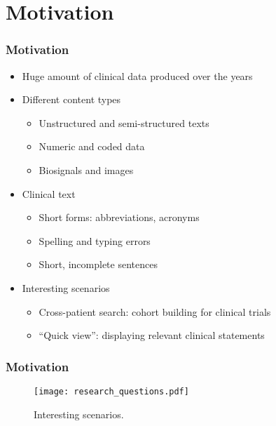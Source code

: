 \section{Motivation}

\begin{frame}
	\frametitle{Motivation}
	\begin{itemize} \myspacing
		\item Huge amount of clinical data produced over the years
		\item Different content types
		\begin{itemize}
			\item Unstructured and semi-structured texts
			\item Numeric and coded data
			\item Biosignals and images
		\end{itemize}
		\item Clinical text
		\begin{itemize}
			\item Short forms: abbreviations, acronyms
			\item Spelling and typing errors
			\item Short, incomplete sentences
		\end{itemize}
		\item Interesting scenarios
		\begin{itemize}
			\item Cross-patient search: cohort building for clinical trials
			\item ``Quick view'': displaying relevant clinical statements
		\end{itemize}
	\end{itemize}
\end{frame}

\begin{frame}
	\frametitle{Motivation}
                \begin{figure}
        			\centering
        			\texttt{[image: research\_questions.pdf]}
        			\caption{Interesting scenarios.}
        			\label{fig:research_questions}
  		\end{figure}
\end{frame}
